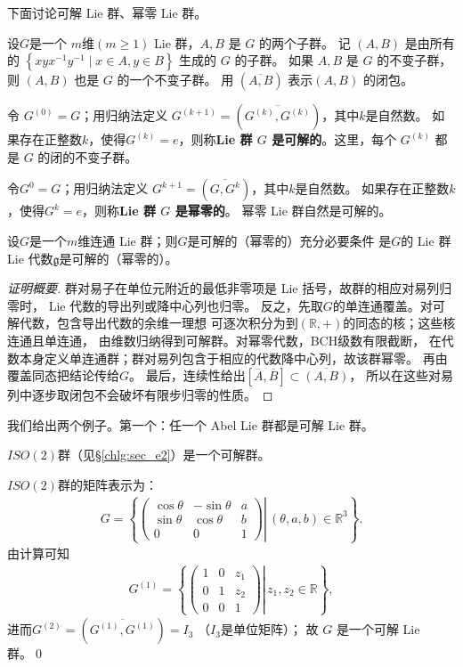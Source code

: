 下面讨论可解 Lie 群、幂零 Lie 群。

设$G$是一个 $m$维$(m \geqslant 1)$ Lie 群，$A, B$ 是 $G$ 的两个子群。
记 $(A, B)$ 是由所有的 $\left\{x y x^{-1} y^{-1} \mid x \in A, y \in B\right\}$ 生成的 $G$ 的子群。
如果 $A, B$ 是 $G$ 的不变子群，则 $(A, B)$ 也是 $G$ 的一个不变子群。
用 $(\overline{A, B})$ 表示$(A, B)$ 的闭包。

令 $G^{(0)}=G$；用归纳法定义 $G^{(k+1)}=\left(\overline{G^{(k)}, G^{(k)}}\right)$，其中$k$是自然数。
如果存在正整数$k$，使得$G^{(k)}=e$，则称\textbf{Lie 群 $G$ 是可解的}。这里，每个 $G^{(k)}$ 都是 $G$ 的闭的不变子群。

令$G^{0}=G$；用归纳法定义 $G^{k+1}=\left(\overline{G, G^{k}}\right)$，其中$k$是自然数。
如果存在正整数$k$，使得$G^{k}=e$，则称\textbf{Lie 群 $G$ 是幂零的}。
幂零 Lie 群自然是可解的。

\begin{theorem}
    设$G$是一个$m$维连通 Lie 群；则$G$是可解的（幂零的）充分必要条件
    是$G$的 Lie 群 Lie 代数$\mathfrak{g}$是可解的（幂零的）。
\end{theorem}
\begin{proof}[证明概要]
群对易子在单位元附近的最低非零项是 Lie 括号，故群的相应对易列归零时，
Lie 代数的导出列或降中心列也归零。
反之，先取$G$的单连通覆盖。对可解代数，包含导出代数的余维一理想
可逐次积分为到$(\mathbb R,+)$的同态的核；这些核连通且单连通，
由维数归纳得到可解群。对幂零代数，BCH级数有限截断，
在代数本身定义单连通群；群对易列包含于相应的代数降中心列，故该群幂零。
再由覆盖同态把结论传给$G$。
最后，连续性给出$[\overline A,\overline B]\subset\overline{(A,B)}$，
所以在这些对易列中逐步取闭包不会破坏有限步归零的性质。
\end{proof}

我们给出两个例子。第一个：任一个 Abel  Lie 群都是可解 Lie 群。

\begin{example}
    $ISO(2)$群（见\S\ref{chlg:sec_e2}）是一个可解群。
\end{example}
$ISO(2)$群的矩阵表示为：
\begin{align*}
    G=\left\{\left.\left(\begin{array}{ccc}
        \cos \theta & -\sin \theta & a \\
        \sin \theta & \cos \theta & b \\
        0 & 0 & 1
    \end{array}\right) \right\rvert\,(\theta, a, b) \in \mathbb{R}^3\right\} .
\end{align*}
由计算可知
\begin{align*}
G^{(1)}=\left\{\left.\left(\begin{array}{ccc}
    1 & 0 & z_1 \\
    0 & 1 & z_2 \\
    0 & 0 & 1
\end{array}\right) \right\rvert\, z_1, z_2 \in \mathbb{R}\right\},
\end{align*}
进而$G^{(2)}=\left(\overline{G^{(1)}, G^{(1)}}\right)=I_3$ （$I_3$是单位矩阵）；
故 $G$ 是一个可解 Lie 群。\qed

